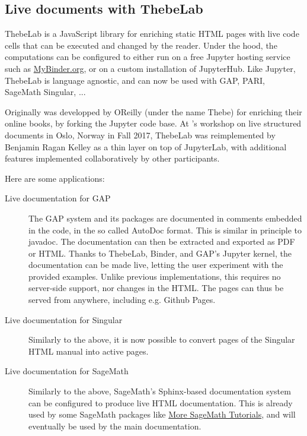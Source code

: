 \documentclass{deliverablereport}
\begin{document}
\subsection{Live documents with ThebeLab}

ThebeLab is a JavaScript library for enriching static HTML pages with live code cells
that can be executed and changed by the reader.
Under the hood, the computations can be configured to either run on a free Jupyter hosting service
such as \url{MyBinder.org}, or on a custom installation of JupyterHub. Like Jupyter, ThebeLab
is language agnostic, and can now be used with GAP, PARI, SageMath Singular, ...

Originally was developped by OReilly (under the name Thebe) for enriching their online books, by forking the Jupyter code base.
At \ODK's workshop on live structured documents in Oslo, Norway in Fall 2017, ThebeLab was
reimplemented by Benjamin Ragan Kelley as a thin layer on top of JupyterLab, with additional
features implemented collaboratively by other participants.

Here are some applications:
\begin{description}
\item[Live documentation for GAP] The GAP system and its packages are documented
  in comments embedded in the code, in the so called AutoDoc format. This is similar in principle to javadoc. The documentation can then be extracted and exported as PDF or HTML. Thanks to ThebeLab, Binder, and GAP's Jupyter kernel, the documentation can be made live, letting the user experiment with the provided examples. Unlike previous implementations, this requires no server-side support, nor changes in the HTML. The pages can thus be served from anywhere, including e.g. Github Pages.
\item[Live documentation for Singular] Similarly to the above, it is now possible to convert pages of the Singular
HTML manual into active pages. %

\item[Live documentation for SageMath] Similarly to the above, SageMath's Sphinx-based documentation system can be configured to produce live HTML documentation. This is already used by some SageMath packages like
\href{http://more-sagemath-tutorials.readthedocs.io/}{More SageMath Tutorials}, and will eventually be used by the main \Sage documentation.
\end{description}

\end{document}
